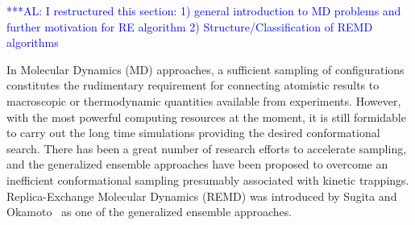 \documentclass[times, 10pt, twocolumn]{article}
\newcommand{\alnote}[1]{ {\textcolor{blue} { ***AL: #1 }}}
\newcommand{\jhanote}[1]{ {\textcolor{red} { ***SJ: #1 }}}
\newcommand{\alnote}[1]{}
\newcommand{\jhanote}[1]{}
\newcommand{\up}{\vspace*{-1em}}
\begin{document}



\up
\alnote{I restructured this section: 1) general introduction to MD problems 
and further motivation for RE algorithm
2) Structure/Classification of REMD algorithms} 

In  Molecular Dynamics (MD) approaches, a sufficient sampling of configurations constitutes
the rudimentary requirement for connecting atomistic results to
macroscopic or thermodynamic quantities available from experiments.
However, with the most powerful computing resources at the moment, it
is still formidable to carry out the long time simulations providing
the desired conformational search.  There has been a great number of
research efforts to accelerate sampling, and the generalized ensemble
approaches have been proposed to overcome an inefficient
conformational sampling presumably associated with kinetic trappings.
Replica-Exchange Molecular Dynamics (REMD) was introduced by Sugita
and Okamoto~\cite{Sugita:1999rm} as one of the generalized ensemble 
approaches.

\end{document}

